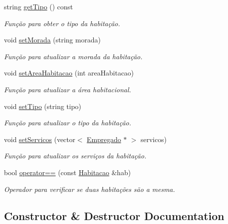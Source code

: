 \begin{DoxyCompactItemize}
string \hyperlink{class_habitacao_a8ab7eac482a13fd7932ae6aae03eeb7f}{get\+Tipo} () const 
\begin{DoxyCompactList}\small\item\em Função para obter o tipo da habitação. \end{DoxyCompactList}\item 
void \hyperlink{class_habitacao_a603791af3e08136c539c0516e95af41f}{set\+Morada} (string morada)
\begin{DoxyCompactList}\small\item\em Função para atualizar a morada da habitação. \end{DoxyCompactList}\item 
void \hyperlink{class_habitacao_a7b42d8414d288665bc0e6fd8bd2b212d}{set\+Area\+Habitacao} (int area\+Habitacao)
\begin{DoxyCompactList}\small\item\em Função para atualizar a área habitacional. \end{DoxyCompactList}\item 
void \hyperlink{class_habitacao_aa668bbab733fda60bbdeb38799c092b7}{set\+Tipo} (string tipo)
\begin{DoxyCompactList}\small\item\em Função para atualizar o tipo da habitação. \end{DoxyCompactList}\item 
void \hyperlink{class_habitacao_a2300762d9e6e88b91efb2e8177ce8106}{set\+Servicos} (vector$<$ \hyperlink{class_empregado}{Empregado} $\ast$ $>$ servicos)
\begin{DoxyCompactList}\small\item\em Função para atualizar os serviços da habitação. \end{DoxyCompactList}\item 
bool \hyperlink{class_habitacao_acd290b8d83f41d4667867d5dc353166e}{operator==} (const \hyperlink{class_habitacao}{Habitacao} \&hab)
\begin{DoxyCompactList}\small\item\em Operador para verificar se duas habitações são a mesma. \end{DoxyCompactList}\end{DoxyCompactItemize}


\subsection{Constructor \& Destructor Documentation}
